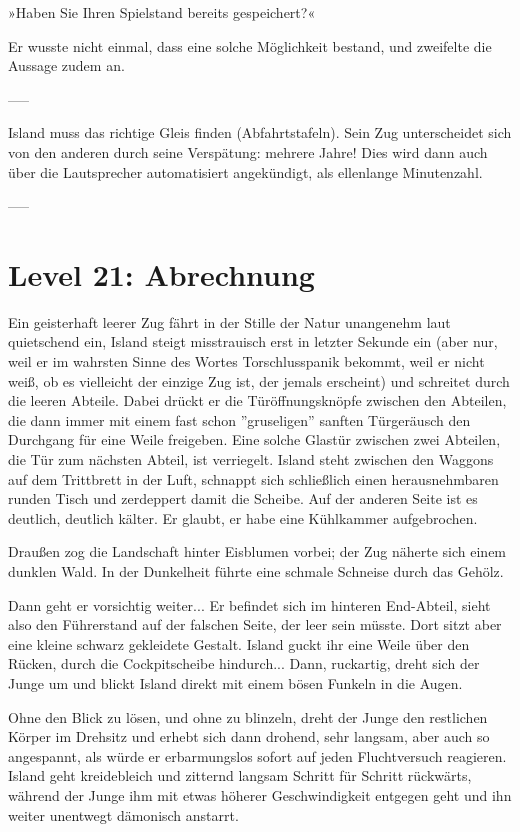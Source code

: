 »Haben Sie Ihren Spielstand bereits gespeichert?«

Er wusste nicht einmal, dass eine solche Möglichkeit bestand, und zweifelte die Aussage zudem an.

-----

Island muss das richtige Gleis finden (Abfahrtstafeln). Sein Zug unterscheidet sich von den anderen durch seine Verspätung: mehrere Jahre! Dies wird dann auch über die Lautsprecher automatisiert angekündigt, als ellenlange Minutenzahl.

-----

\section{Level 21: Abrechnung}

Ein geisterhaft leerer Zug fährt in der Stille der Natur unangenehm laut quietschend ein, Island steigt misstrauisch erst in letzter Sekunde ein (aber nur, weil er im wahrsten Sinne des Wortes Torschlusspanik bekommt, weil er nicht weiß, ob es vielleicht der einzige Zug ist, der jemals erscheint) und schreitet durch die leeren Abteile. Dabei drückt er die Türöffnungsknöpfe zwischen den Abteilen, die dann immer mit einem fast schon ''gruseligen'' sanften Türgeräusch den Durchgang für eine Weile freigeben. Eine solche Glastür zwischen zwei Abteilen, die Tür zum nächsten Abteil, ist verriegelt. Island steht zwischen den Waggons auf dem Trittbrett in der Luft, schnappt sich schließlich einen herausnehmbaren runden Tisch und zerdeppert damit die Scheibe. Auf der anderen Seite ist es deutlich, deutlich kälter. Er glaubt, er habe eine Kühlkammer aufgebrochen.

Draußen zog die Landschaft hinter Eisblumen vorbei; der Zug näherte sich einem dunklen Wald. In der Dunkelheit führte eine schmale Schneise durch das Gehölz.

Dann geht er vorsichtig weiter... Er befindet sich im hinteren End-Abteil, sieht also den Führerstand auf der falschen Seite, der leer sein müsste. Dort sitzt aber eine kleine schwarz gekleidete Gestalt. Island guckt ihr eine Weile über den Rücken, durch die Cockpitscheibe hindurch... Dann, ruckartig, dreht sich der Junge um und blickt Island direkt mit einem bösen Funkeln in die Augen.

Ohne den Blick zu lösen, und ohne zu blinzeln, dreht der Junge den restlichen Körper im Drehsitz und erhebt sich dann drohend, sehr langsam, aber auch so angespannt, als würde er erbarmungslos sofort auf jeden Fluchtversuch reagieren. Island geht kreidebleich und zitternd langsam Schritt für Schritt rückwärts, während der Junge ihm mit etwas höherer Geschwindigkeit entgegen geht und ihn weiter unentwegt dämonisch anstarrt.


